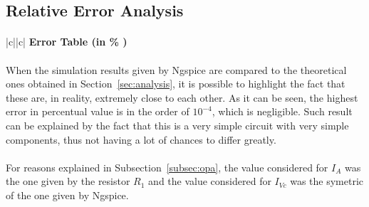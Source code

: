 \subsection{Relative Error Analysis}

\paragraph{}
\begin{center}
\begin{tabular}{|c||c|}
      \hline    
       {\bf Error Table (in \% )} \\
      \hline

	
     
      \end{tabular}
\end{center}

\paragraph{} When the simulation results given by Ngspice are compared to the theoretical ones obtained in  Section~\ref{sec:analysis}, it is possible to highlight the fact that these are, in reality, extremely close to each other. As it can be seen, the highest error in percentual value is in the order of $10^{-4}$, which is negligible. Such result can be explained by the fact that this is a very simple circuit with very simple components, thus not having a lot of chances to differ greatly.

\paragraph{}For reasons explained in Subsection~\ref{subsec:opa}, the value considered for $I_A$ was the one given by the resistor $R_1$ and the value considered for $I_{Vc}$ was the symetric of the one given by Ngspice.

